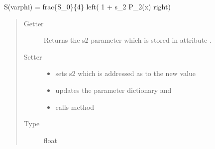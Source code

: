\documentclass[letterpaper,10pt,english]{sphinxmanual}
\begin{document}
\begin{fulllineitems}
\begin{fulllineitems}
S(varphi) = frac\{S\_0\}\{4\} left( 1 + s\_2 P\_2(x) right)
\begin{quote}\begin{description}
\item[{Getter}] \leavevmode
Returns the s2 parameter which is stored in attribute .

\item[{Setter}] \leavevmode\begin{itemize}
\item {} 
sets s2 which is addressed as  to the new value

\item {} 
updates the parameter dictionary  and

\item {} 
calls method 

\end{itemize}

\item[{Type}] \leavevmode
float

\end{description}\end{quote}

\end{fulllineitems}


\end{fulllineitems}

\end{document}
